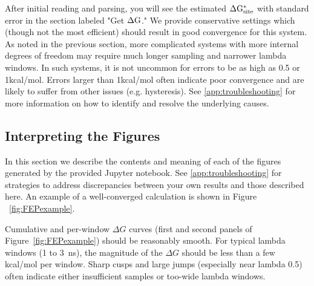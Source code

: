 \documentclass[9pt,tutorial]{Styling/livecoms}
\begin{document}
After initial reading and parsing, you will see the estimated $\Delta \rm{G}_{\rm{site}}^*$ with standard error in the section labeled "Get $\Delta \rm G$." We provide conservative settings which (though not the most efficient) should result in good convergence for this system. As noted in the previous section, more complicated systems with more internal degrees of freedom may require much longer sampling and narrower lambda windows. In such systems, it is not uncommon for errors to be as high as 0.5 or 1kcal/mol. Errors larger than 1kcal/mol often indicate poor convergence and are likely to suffer from other issues (e.g. hysteresis). See \ref{app:troubleshooting} for more information on how to identify and resolve the underlying causes.

\subsection{Interpreting the Figures}\label{app:InterpretingFEP}
In this section we describe the contents and meaning of each of the figures generated by the provided Jupyter notebook. See \ref{app:troubleshooting} for strategies to address discrepancies between your own results and those described here. An example of a well-converged calculation is shown in Figure ~\ref{fig:FEPexample}.

Cumulative and per-window $\Delta G$ curves (first and second panels of Figure~\ref{fig:FEPexample}) should be reasonably smooth. For typical lambda windows (1 to 3~ns), the magnitude of the $\Delta G$ should be less than a few kcal/mol per window. Sharp cusps and large jumps (especially near lambda 0.5) often indicate either insufficient samples or too-wide lambda windows.
\end{document}
